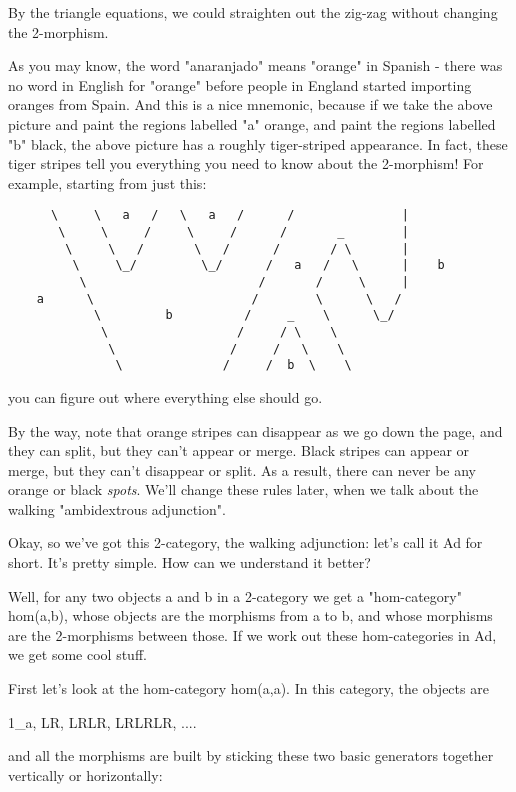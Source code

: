 By the triangle equations, we could straighten out the zig-zag without
changing the 2-morphism.

As you may know, the word "anaranjado" means
"orange" in Spanish - there was no word in English for
"orange" before people in England started importing oranges
from Spain.  And this is a nice mnemonic, because if we take the above
picture and paint the regions labelled "a" orange, and paint
the regions labelled "b" black, the above picture has a
roughly tiger-striped appearance.  In fact, these tiger stripes tell you
everything you need to know about the 2-morphism!  For example, starting
from just this:

\begin{verbatim}
      \     \   a   /   \   a   /      /               |
       \     \     /     \     /      /       _        |
        \     \   /       \   /      /       / \       |
         \     \_/         \_/      /   a   /   \      |    b
          \                        /       /     \     |
    a      \                      /        \      \   / 
            \         b          /     _    \      \_/ 
             \                  /     / \    \      
              \                /     /   \    \       
               \              /     /  b  \    \  
\end{verbatim}
    
you can figure out where everything else should go.


By the way, note that orange stripes can disappear as we go down the
page, and they can split, but they can't appear or merge.  Black stripes
can appear or merge, but they can't disappear or split.  As a result,
there can never be any orange or black \emph{spots}.  We'll change
these rules later, when we talk about the walking "ambidextrous
adjunction".

Okay, so we've got this 2-category, the walking adjunction: let's call
it Ad for short.  It's pretty simple.  How can we understand it better?


Well, for any two objects a and b in a 2-category we get a
"hom-category" hom(a,b), whose objects are the morphisms from
a to b, and whose morphisms are the 2-morphisms between those.  If we
work out these hom-categories in Ad, we get some cool stuff.

First let's look at the hom-category hom(a,a).   In this category,
the objects are 

1_{a}, LR, LRLR, LRLRLR, ....

and all the morphisms are built by sticking these two basic
generators together vertically or horizontally:

